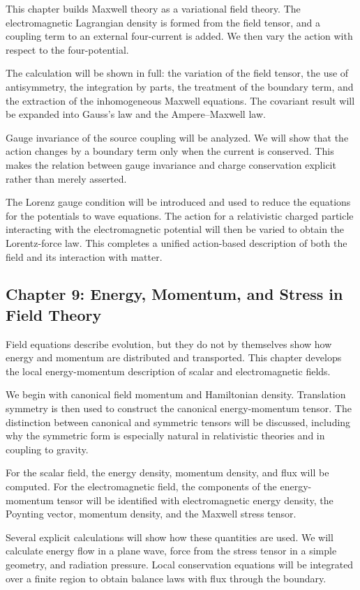 This chapter builds Maxwell theory as a variational field theory. The electromagnetic Lagrangian density is formed from the field tensor, and a coupling term to an external four-current is added. We then vary the action with respect to the four-potential.

The calculation will be shown in full: the variation of the field tensor, the use of antisymmetry, the integration by parts, the treatment of the boundary term, and the extraction of the inhomogeneous Maxwell equations. The covariant result will be expanded into Gauss's law and the Ampere--Maxwell law.

Gauge invariance of the source coupling will be analyzed. We will show that the action changes by a boundary term only when the current is conserved. This makes the relation between gauge invariance and charge conservation explicit rather than merely asserted.

The Lorenz gauge condition will be introduced and used to reduce the equations for the potentials to wave equations. The action for a relativistic charged particle interacting with the electromagnetic potential will then be varied to obtain the Lorentz-force law. This completes a unified action-based description of both the field and its interaction with matter.

\subsection*{Chapter 9: Energy, Momentum, and Stress in Field Theory}

Field equations describe evolution, but they do not by themselves show how energy and momentum are distributed and transported. This chapter develops the local energy-momentum description of scalar and electromagnetic fields.

We begin with canonical field momentum and Hamiltonian density. Translation symmetry is then used to construct the canonical energy-momentum tensor. The distinction between canonical and symmetric tensors will be discussed, including why the symmetric form is especially natural in relativistic theories and in coupling to gravity.

For the scalar field, the energy density, momentum density, and flux will be computed. For the electromagnetic field, the components of the energy-momentum tensor will be identified with electromagnetic energy density, the Poynting vector, momentum density, and the Maxwell stress tensor.

Several explicit calculations will show how these quantities are used. We will calculate energy flow in a plane wave, force from the stress tensor in a simple geometry, and radiation pressure. Local conservation equations will be integrated over a finite region to obtain balance laws with flux through the boundary.

